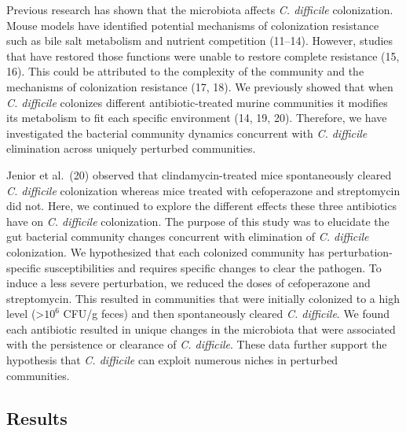 \documentclass[11pt,]{article}
\begin{document}
Previous research has shown that the microbiota affects \emph{C.
difficile} colonization. Mouse models have identified potential
mechanisms of colonization resistance such as bile salt metabolism and
nutrient competition (11--14). However, studies that have restored those
functions were unable to restore complete resistance (15, 16). This
could be attributed to the complexity of the community and the
mechanisms of colonization resistance (17, 18). We previously showed
that when \emph{C. difficile} colonizes different antibiotic-treated
murine communities it modifies its metabolism to fit each specific
environment (14, 19, 20). Therefore, we have investigated the bacterial
community dynamics concurrent with \emph{C. difficile} elimination
across uniquely perturbed communities.

Jenior et al.~(20) observed that clindamycin-treated mice spontaneously
cleared \emph{C. difficile} colonization whereas mice treated with
cefoperazone and streptomycin did not. Here, we continued to explore the
different effects these three antibiotics have on \emph{C. difficile}
colonization. The purpose of this study was to elucidate the gut
bacterial community changes concurrent with elimination of \emph{C.
difficile} colonization. We hypothesized that each colonized community
has perturbation-specific susceptibilities and requires specific changes
to clear the pathogen. To induce a less severe perturbation, we reduced
the doses of cefoperazone and streptomycin. This resulted in communities
that were initially colonized to a high level (\textgreater{}\(10^{6}\)
CFU/g feces) and then spontaneously cleared \emph{C. difficile}. We
found each antibiotic resulted in unique changes in the microbiota that
were associated with the persistence or clearance of \emph{C.
difficile}. These data further support the hypothesis that \emph{C.
difficile} can exploit numerous niches in perturbed communities.

\hypertarget{results}{%
\subsection{Results}\label{results}}
\end{document}
